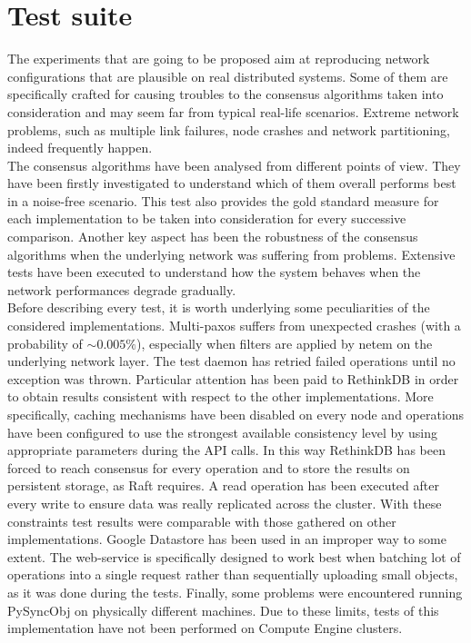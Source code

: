 \chapter{Test suite}\label{chp:test_suite}

The experiments that are going to be proposed aim at reproducing network configurations that are plausible on real distributed systems. Some of them are specifically crafted for causing troubles to the consensus algorithms taken into consideration and may seem far from typical real-life scenarios. Extreme network problems, such as multiple link failures, node crashes and network partitioning, indeed frequently happen.\\
The consensus algorithms have been analysed from different points of view. They have been firstly investigated to understand which of them overall performs best in a noise-free scenario. This test also provides the gold standard measure for each implementation to be taken into consideration for every successive comparison. Another key aspect has been the robustness of the consensus algorithms when the underlying network was suffering from problems. Extensive tests have been executed to understand how the system behaves when the network performances degrade gradually.\\
Before describing every test, it is worth underlying some peculiarities of the considered implementations. Multi-paxos suffers from unexpected crashes (with a probability of \(\sim0.005\%\)), especially when filters are applied by netem on the underlying network layer. The test daemon has retried failed operations until no exception was thrown. Particular attention has been paid to RethinkDB in order to obtain results consistent with respect to the other implementations. More specifically, caching mechanisms have been disabled on every node and operations have been configured to use the strongest available consistency level by using appropriate parameters during the API calls. In this way RethinkDB has been forced to reach consensus for every operation and to store the results on persistent storage, as Raft requires. A read operation has been executed after every write to ensure data was really replicated across the cluster. With these constraints test results were comparable with those gathered on other implementations. Google Datastore has been used in an improper way to some extent. The web-service is specifically designed to work best when batching lot of operations into a single request rather than sequentially uploading small objects, as it was done during the tests. Finally, some problems were encountered running PySyncObj on physically different machines. Due to these limits, tests of this implementation have not been performed on Compute Engine clusters.

